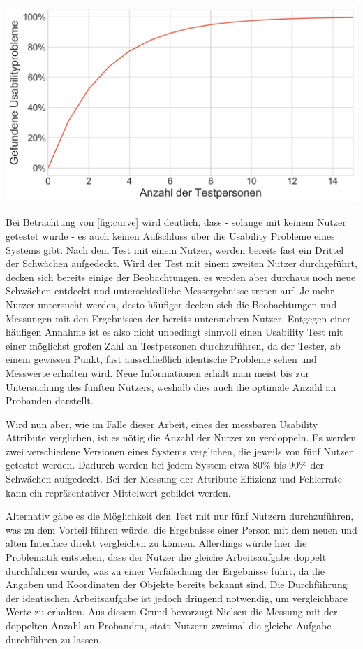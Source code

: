 \begin{center}
  \includegraphics[width=0.7\linewidth]{figures/curve.png}
  \label{fig:curve}
\end{center}

Bei Betrachtung von \cref{fig:curve} wird deutlich, dass - solange mit keinem Nutzer getestet wurde - es auch keinen Aufschluss über die Usability Probleme eines Systems gibt.
Nach dem Test mit einem Nutzer, werden bereits fast ein Drittel der Schwächen aufgedeckt.
Wird der Test mit einem zweiten Nutzer durchgeführt, decken sich bereits einige der Beobachtungen, es werden aber durchaus noch neue Schwächen entdeckt und unterschiedliche Messergebnisse treten auf.
Je mehr Nutzer untersucht werden, desto häufiger decken sich die Beobachtungen und Messungen mit den Ergebnissen der bereits untersuchten Nutzer.\cite{.h}
Entgegen einer häufigen Annahme ist es also nicht unbedingt sinnvoll einen Usability Test mit einer möglichst großen Zahl an Testpersonen durchzuführen, da der Tester, ab einem gewissen Punkt, fast ausschließlich identische Probleme sehen und Messwerte erhalten wird.
Neue Informationen erhält man meist bis zur Untersuchung des fünften Nutzers, weshalb dies auch die optimale Anzahl an Probanden darstellt.

Wird nun aber, wie im Falle dieser Arbeit, eines der messbaren Usability Attribute verglichen, ist es nötig die Anzahl der Nutzer zu verdoppeln.
Es werden zwei verschiedene Versionen eines Systems verglichen, die jeweils von fünf Nutzer getestet werden.
Dadurch werden bei jedem System etwa 80\% bis 90\% der Schwächen aufgedeckt.
Bei der Messung der Attribute Effizienz und Fehlerrate kann ein repräsentativer Mittelwert gebildet werden.

Alternativ gäbe es die Möglichkeit den Test mit nur fünf Nutzern durchzuführen, was zu dem Vorteil führen würde, die Ergebnisse einer Person mit dem neuen und alten Interface direkt vergleichen zu können.
Allerdings würde hier die Problematik entstehen, dass der Nutzer die gleiche Arbeitsaufgabe doppelt durchführen würde, was zu einer Verfälschung der Ergebnisse führt, da die Angaben und Koordinaten der Objekte bereits bekannt sind.
Die Durchführung der identischen Arbeitsaufgabe ist jedoch dringend notwendig, um vergleichbare Werte zu erhalten.
Aus diesem Grund bevorzugt Nielsen die Messung mit der doppelten Anzahl an Probanden, statt Nutzern zweimal die gleiche Aufgabe durchführen zu lassen.\cite{.h}

